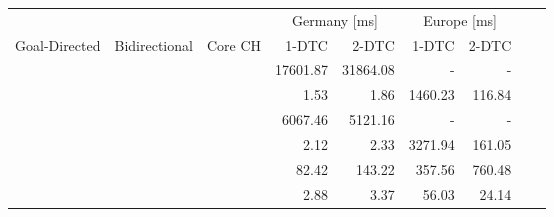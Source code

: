 \begin{tabular}{cccrrrrrr}
	\toprule
	              &               &         & \multicolumn{2}{c}{Germany [\si{\milli\second}]} & \multicolumn{2}{c}{Europe [\si{\milli\second}]}                 \\
	Goal-Directed & Bidirectional & Core CH & 1-DTC                                            & 2-DTC                                           & 1-DTC & 2-DTC \\
	\midrule
	\xmark        & \xmark        & \xmark  & 17601.87                                                & 31864.08                                               & -     & -     \\
	\cmark        & \xmark        & \xmark  & 1.53                                                & 1.86                                               & 1460.23     & 116.84     \\
	\xmark        & \cmark        & \xmark  & 6067.46                                                & 5121.16                                               & -     & -     \\
	\cmark        & \cmark        & \xmark  & 2.12                                                & 2.33                                               & 3271.94     & 161.05     \\
	\xmark        & \cmark        & \cmark  & 82.42                                                & 143.22                                               & 357.56     & 760.48     \\
	\cmark        & \cmark        & \cmark  & 2.88                                                & 3.37                                               & 56.03     & 24.14     \\
	\bottomrule
\end{tabular}